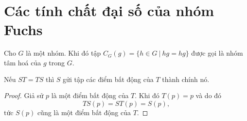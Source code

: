 \section{Các tính chất đại số của nhóm Fuchs}
\begin{defn}
    Cho $G$ là một nhóm. Khi đó tập $C_G(g) = \{h \in G~|~hg = hg\}$ được gọi là nhóm tâm hoá của $g$ trong $G$.
\end{defn}
\begin{lem}\label{lem 3.3.2}
    Nếu $ST = TS$ thì $S$ gửi tập các điểm bất động của $T$ thành chính nó.
\end{lem}
\begin{proof}
    Giả sử $p$ là một điểm bất động của $T$. Khi đó $T(p) = p$ và do đó 
    \[TS(p) = ST(p)=S(p),\]
    tức $S(p)$ cũng là một điểm bất động của $T$.
\end{proof}

